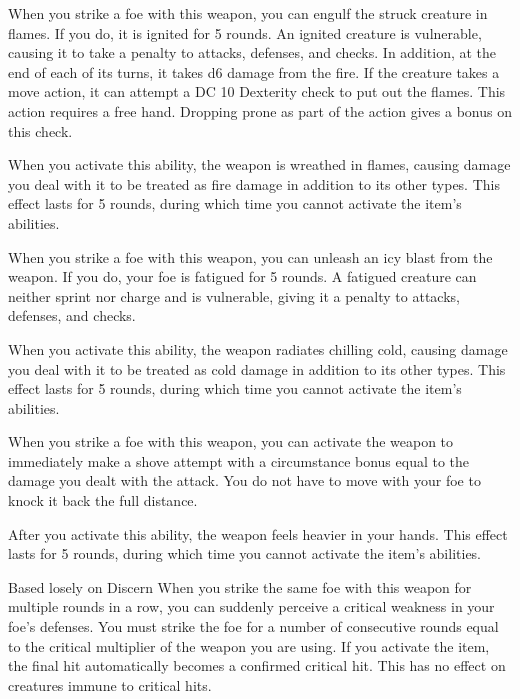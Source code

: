  When you strike a foe with this weapon, you can engulf the struck creature in flames.
If you do, it is ignited for 5 rounds.
An ignited creature is vulnerable, causing it to take a  penalty to attacks, defenses, and checks.
In addition, at the end of each of its turns, it takes d6 damage from the fire.
If the creature takes a move action, it can attempt a DC 10 Dexterity check to put out the flames.
This action requires a free hand.
Dropping prone as part of the action gives a  bonus on this check.

When you activate this ability, the weapon is wreathed in flames, causing damage you deal with it to be treated as fire damage in addition to its other types.
This effect lasts for 5 rounds, during which time you cannot activate the item's abilities.


 When you strike a foe with this weapon, you can unleash an icy blast from the weapon.
If you do, your foe is fatigued for 5 rounds.
A fatigued creature can neither sprint nor charge and is vulnerable, giving it a  penalty to attacks, defenses, and checks.

When you activate this ability, the weapon radiates chilling cold, causing damage you deal with it to be treated as cold damage in addition to its other types.
This effect lasts for 5 rounds, during which time you cannot activate the item's abilities.


 When you strike a foe with this weapon, you can activate the weapon to immediately make a shove attempt with a circumstance bonus equal to the damage you dealt with the attack.
You do not have to move with your foe to knock it back the full distance.

After you activate this ability, the weapon feels heavier in your hands.
This effect lasts for 5 rounds, during which time you cannot activate the item's abilities.


Based losely on Discern
 When you strike the same foe with this weapon for multiple rounds in a row, you can suddenly perceive a critical weakness in your foe's defenses.
You must strike the foe for a number of consecutive rounds equal to the critical multiplier of the weapon you are using.
If you activate the item, the final hit automatically becomes a confirmed critical hit.
This has no effect on creatures immune to critical hits.

